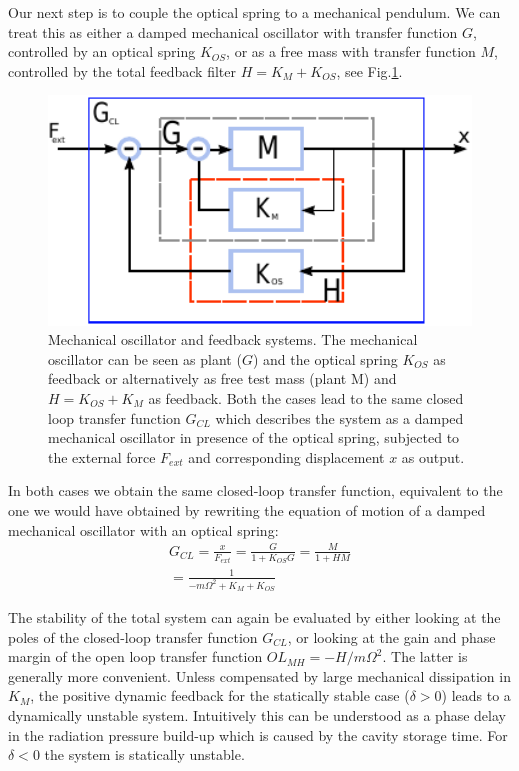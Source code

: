 Our next step is to couple the optical spring to a mechanical pendulum. We can treat this as either a damped mechanical oscillator with transfer function $G$, controlled by an optical spring $K_{OS}$, or as a free mass with transfer function $M$, controlled by the total feedback filter $H = K_M + K_{OS}$, see Fig.\ref{fig:blocks2}.
\begin{figure}[htbp]
	\centering
		\includegraphics[width=15cm]{./figures/blocks_paper.pdf}
	\caption[Mechanical Oscillator and Feedback Systems]{Mechanical oscillator and feedback systems. The mechanical oscillator can be seen as plant ($G$) and the optical spring $K_{OS}$ as feedback or
	alternatively as free test mass (plant M) and $H=K_{OS}+K_M$ as feedback. 
	Both the cases lead to the same closed loop transfer function $G_{CL}$ which describes the system as a damped mechanical oscillator in presence of
	the optical spring, subjected to the external force $F_{ext}$ and corresponding displacement $x$ as output.}
	\label{fig:blocks2}
\end{figure}
In both cases we obtain the same closed-loop transfer function, equivalent to the one we would have obtained by
rewriting the equation of motion of a damped mechanical oscillator with an optical spring:
\begin{eqnarray}
\label{eqn:TFco}
G_{CL}=\frac{x}{F_{ext}}=\frac{G}{1+K_{OS} G}=\frac{M}{1+H M}\nonumber\\
=\frac{1}{-m\Omega^2+K_M+K_{OS}}%
\end{eqnarray}

The stability of the total system can again be evaluated  by either looking at the poles of the closed-loop
transfer function $G_{CL}$, or looking at the gain and phase margin of the open loop transfer function $OL_{MH}=-H/m\Omega^2$. The latter is generally more convenient. Unless compensated by large mechanical dissipation in $K_M$, the positive dynamic feedback for the statically stable case ($\delta>0$) leads to a dynamically unstable system. 
Intuitively this can be understood as a phase delay in the radiation pressure build-up which is caused by the cavity storage time.
For $\delta<0$ the system is statically unstable.

